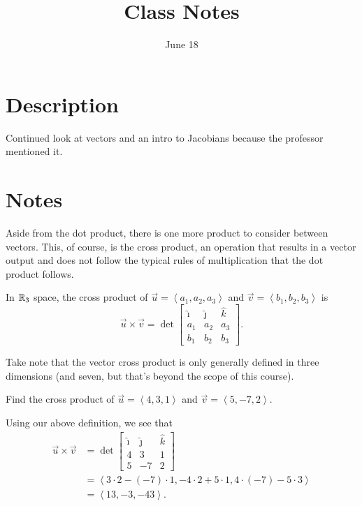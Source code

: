\documentclass[12pt]{scrartcl}
\title{Class Notes}
\date{June 18}
\begin{document}
\maketitle

\pagebreak

\section{Description}

Continued look at vectors and an intro to Jacobians because the professor mentioned it.

\section{Notes}

Aside from the dot product, there is one more product to consider between vectors. This, of course, is the cross product, an operation that results in a vector output and does not follow the typical rules of multiplication that the dot product follows.

\begin{definition}
    In $\mathbb R_{3}$ space, the cross product of $\vec{u} = \left<a_{1}, a_{2}, a_{3}\right>$ and $\vec{v} = \left<b_{1}, b_{2}, b_{3}\right>$ is
    \[\vec{u} \times \vec{v} = \det \begin{bmatrix} \hat{\imath} & \hat{\jmath} & \hat{k} \\ a_{1} & a_{2} & a_{3} \\ b_{1} & b_{2} & b_{3} \end{bmatrix}.\]
\end{definition}

\begin{remark}
    Take note that the vector cross product is only generally defined in three dimensions (and seven, but that's beyond the scope of this course).
\end{remark}

\begin{example}
    Find the cross product of $\vec{u} = \left<4, 3, 1\right>$ and $\vec{v} = \left<5, -7, 2\right>$.

    \begin{soln}
        Using our above definition, we see that
        \begin{align*}
            \vec{u} \times \vec{v} &= \det \begin{bmatrix}
                \hat{\imath} & \hat{\jmath} & \hat{k} \\
                4 & 3 & 1 \\
                5 & -7 & 2
            \end{bmatrix} \\
            &= \left<3 \cdot 2 - (-7) \cdot 1, -4 \cdot 2 + 5 \cdot 1, 4 \cdot (-7) - 5 \cdot 3\right> \\
            &= \left<13, -3, -43\right>.
        \end{align*}
    \end{soln}
\end{example}
\end{document}
